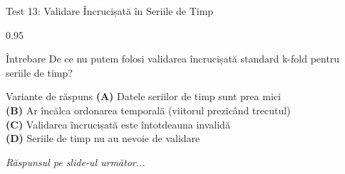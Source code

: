 \documentclass[9pt, aspectratio=169, t]{beamer}
\begin{document}
\begin{frame}{Test 13: Validare Încrucișată în Seriile de Timp}
    \begin{cminipage}{0.95\textwidth}
    \begin{alertblock}{Întrebare}
        De ce nu putem folosi validarea încrucișată standard k-fold pentru seriile de timp?
    \end{alertblock}

    \vspace{0.4cm}

    \begin{block}{Variante de răspuns}
    \textcolor{MainBlue}{\textbf{(A)}} Datele seriilor de timp sunt prea mici\\[3pt]
    \textcolor{MainBlue}{\textbf{(B)}} Ar încălca ordonarea temporală (viitorul prezicând trecutul)\\[3pt]
    \textcolor{MainBlue}{\textbf{(C)}} Validarea încrucișată este întotdeauna invalidă\\[3pt]
    \textcolor{MainBlue}{\textbf{(D)}} Seriile de timp nu au nevoie de validare
    \end{block}
    \vspace{0.5cm}

    \begin{center}
        \textit{Răspunsul pe slide-ul următor...}
    \end{center}
    \end{cminipage}
\end{frame}
\end{document}
